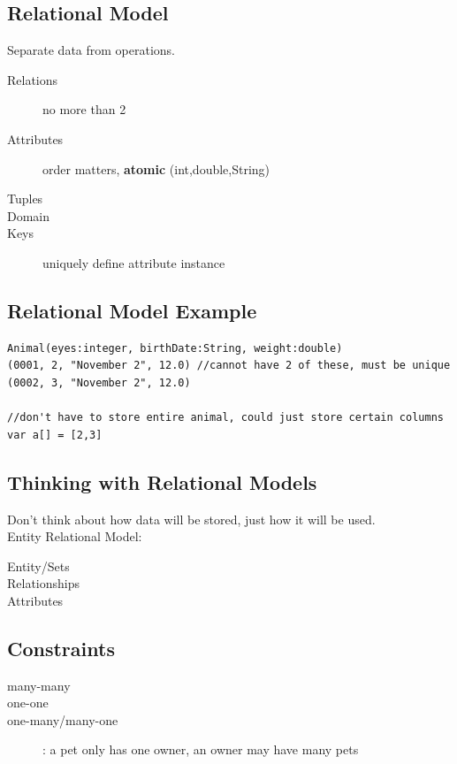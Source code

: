 \documentclass{article}
\begin{document}
\subsection{Relational Model}
Separate data from operations.

\begin{description}
    \item[Relations] {no more than 2}
    \item[Attributes] { order matters, \textbf{atomic} (int,double,String) }
    \item[Tuples]
    \item[Domain]
    \item[Keys] uniquely define attribute instance
\end{description}

\subsection{Relational Model Example}
\begin{lstlisting}
Animal(eyes:integer, birthDate:String, weight:double)
(0001, 2, "November 2", 12.0) //cannot have 2 of these, must be unique
(0002, 3, "November 2", 12.0)

//don't have to store entire animal, could just store certain columns
var a[] = [2,3]  
\end{lstlisting}

\subsection{Thinking with Relational Models}
Don't think about how data will be stored, just how it will be used.\\
Entity Relational Model:
\begin{description}
    \item[ Entity/Sets ]
    \item[ Relationships ]
    \item[ Attributes ]
\end{description}

\subsection{Constraints}
\begin{description}
    \item[many-many]
    \item[one-one]
    \item[one-many/many-one]: a pet only has one owner, an owner may have many
        pets
\end{description}
\end{document}
